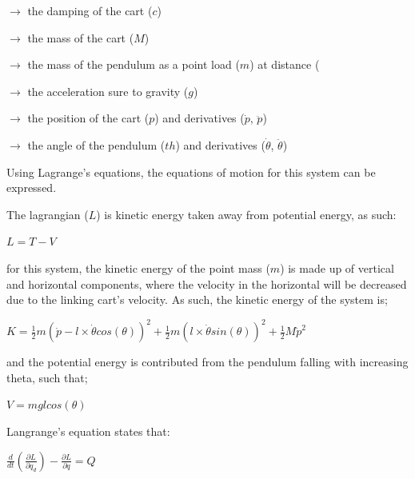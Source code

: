 \documentclass[12pt]{article}
\begin{document}
$\rightarrow$ the damping of the cart ($c$)

$\rightarrow$ the mass of the cart ($M$)

$\rightarrow$ the mass of the pendulum as a point load ($m$) at distance (%

$\rightarrow$ the acceleration sure to gravity ($g$)

$\rightarrow$ the position of the cart ($p$) and derivatives ($\dot{p}$, $\ddot{p}$)

$\rightarrow$ the angle of the pendulum ($th$) and derivatives ($\dot{\theta}$, $\ddot{\theta}$)

\vspace{\baselineskip}

Using Lagrange's equations, the equations of motion for this system can be expressed. 

The lagrangian ($L$) is kinetic energy taken away from potential energy, as such:


\vspace{\baselineskip} 
$L = T - V$
\vspace{\baselineskip}


for this system, the kinetic energy of the point mass ($m$) is made up of vertical and horizontal components, where the velocity in the horizontal will be decreased due to the linking cart's velocity. As such, the kinetic energy of the system is;


\vspace{\baselineskip}

$K = \frac{1}{2} m (\dot{p} - l \times \dot{\theta} cos(\theta))^2 + \frac{1}{2} m (l \times \dot{\theta} sin(\theta))^2 + \frac{1}{2} M \dot{p}^2$

\vspace{\baselineskip}


and the potential energy is contributed from the pendulum falling with increasing theta, such that;


\vspace{\baselineskip}

$V = m g l cos(\theta)$


\vspace{\baselineskip}


Langrange's equation states that:


\vspace{\baselineskip}


$\frac{d}{dt} (\frac{\partial L}{\partial q_d}) - \frac{\partial L}{\partial q} = Q$


\vspace{\baselineskip}
\end{document}
